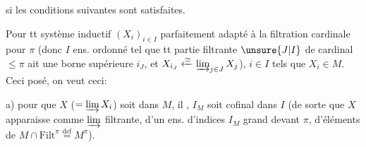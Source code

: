 si les conditions suivantes sont satisfaites.

Pour tt  système inductif $(X_i)_{i\in I}$ parfaitement adapté à la filtration cardinale pour $\pi$ (donc $I$ ens. ordonné   tel que tt partie filtrante $\unsure{J|I}$ de cardinal $\leq\pi$ ait une borne supérieure $i_J$, et $X_{i_J}\xleftarrow{\simeq}\varinjlim_{j\in J}X_j$),      $i\in I$ tels que $X_i\in M$.  Ceci posé, on veut ceci:

a) pour que $X$ ($=\varinjlim X_i$) soit dans $M$, il ,    $I_M$ soit cofinal dans $I$ (de sorte que $X$ apparaisse comme $\varinjlim$ filtrante, d'un ens. d'indices $I_M$ grand devant $\pi$, d'éléments de $M\cap\mathrm{Filt}^{\pi}\overset{\mathrm{def}}{=}M^{\pi}$).

